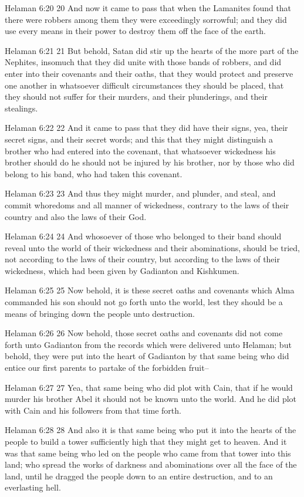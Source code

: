 Helaman 6:20
 20 And now it came to pass that when the Lamanites found that
there were robbers among them they were exceedingly sorrowful;
and they did use every means in their power to destroy them off
the face of the earth.

Helaman 6:21
 21 But behold, Satan did stir up the hearts of the more part of
the Nephites, insomuch that they did unite with those bands of
robbers, and did enter into their covenants and their oaths, that
they would protect and preserve one another in whatsoever
difficult circumstances they should be placed, that they should
not suffer for their murders, and their plunderings, and their
stealings.

Helaman 6:22
 22 And it came to pass that they did have their signs, yea,
their secret signs, and their secret words; and this that they
might distinguish a brother who had entered into the covenant,
that whatsoever wickedness his brother should do he should not be
injured by his brother, nor by those who did belong to his band,
who had taken this covenant.

Helaman 6:23
 23 And thus they might murder, and plunder, and steal, and
commit whoredoms and all manner of wickedness, contrary to the
laws of their country and also the laws of their God.

Helaman 6:24
 24 And whosoever of those who belonged to their band should
reveal unto the world of their wickedness and their abominations,
should be tried, not according to the laws of their country, but
according to the laws of their wickedness, which had been given
by Gadianton and Kishkumen.

Helaman 6:25
 25 Now behold, it is these secret oaths and covenants which Alma
commanded his son should not go forth unto the world, lest they
should be a means of bringing down the people unto destruction.

Helaman 6:26
 26 Now behold, those secret oaths and covenants did not come
forth unto Gadianton from the records which were delivered unto
Helaman; but behold, they were put into the heart of Gadianton by
that same being who did entice our first parents to partake of
the forbidden fruit--

Helaman 6:27
 27 Yea, that same being who did plot with Cain, that if he would
murder his brother Abel it should not be known unto the world.
And he did plot with Cain and his followers from that time forth.

Helaman 6:28
 28 And also it is that same being who put it into the hearts of
the people to build a tower sufficiently high that they might get
to heaven. And it was that same being who led on the people who
came from that tower into this land; who spread the works of
darkness and abominations over all the face of the land, until he
dragged the people down to an entire destruction, and to an
everlasting hell.

